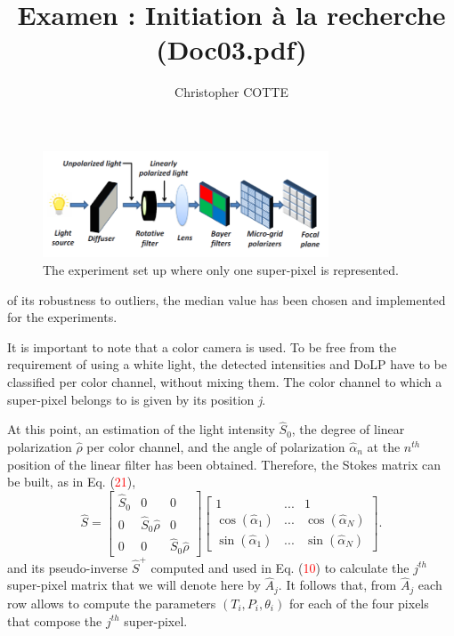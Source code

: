 \documentclass[10pt,twocolumn,letterpaper]{article}
\begin{document}
\nocite{*}

\title{Examen : Initiation à la recherche (Doc03.pdf)}
\author{Christopher COTTE}
\maketitle

\begin{figure}
    \centering
    \includegraphics[width=8.5cm]{images/Figure_1.png}
    \caption{The experiment set up where only one super-pixel is represented.}
    \label{fig:my_label}
\end{figure}
of its robustness to outliers, the median value has been chosen and implemented for the experiments.

It is important to note that a color camera is used. To be free from the requirement of using a white light, the detected intensities and DoLP have to be classified per color channel, without mixing them. The color channel to which a super-pixel belongs to is given by its position \textit{j}.

At this point, an estimation of the light intensity $\hat{S}_0$, the degree of linear polarization $\hat{\rho}$ per color channel, and the angle of polarization $\hat{\alpha}_n$ at the $n^{th}$ position of the linear filter has been obtained. Therefore, the Stokes matrix can be built, as in Eq. (\textcolor{red}{21}),
\begin{equation}
   \hat{S} = \begin{bmatrix} \hat{S}_0 & 0 & 0 \\ 0 & \hat{S}_0\hat{\rho} & 0 \\ 0 & 0 & \hat{S}_0\hat{\rho} \end{bmatrix} \begin{bmatrix} 1 & ... & 1 \\ \cos(\hat{\alpha}_1) & ... & \cos(\hat{\alpha}_N) \\ \sin(\hat{\alpha}_1) & ... & \sin(\hat{\alpha}_N) \end{bmatrix} . 
\end{equation}
and its pseudo-inverse \textbf{$\hat{S}^+$} computed and used in Eq. (\textcolor{red}{10}) to calculate the $j^{th}$ super-pixel matrix that we will denote here by \textbf{$\hat{A}_j$}. It follows that, from \textbf{$\hat{A}_j$} each row allows to compute the parameters $(T_i, P_i, \theta_i)$ for each of the four pixels that compose the $j^{th}$ super-pixel.
\end{document}
